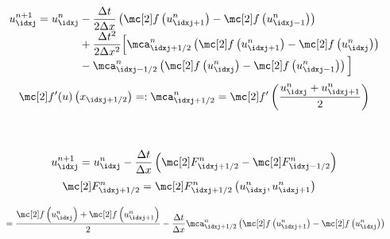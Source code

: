 \begin{defnbox}\nospacing
    \begin{defn}\label{defn:lax-wendroff_scheme}
        \begin{align}
          u_{\idxj}^{n+1}=u_{\idxj}^{n}&-\frac{\Delta t}{2\Delta x}
          \left(\flux \left(u_{\idxj+1}^{n}\right)-\flux \left(u_{\idxj-1}^{n}\right)\right)\\[-1\jot]
          &+\frac{\Delta t^{2}}{2\Delta x^{2}}
            \Big[\mca^{n}_{\idxj+1/2}\left(\flux \left(u_{\idxj+1}^{n}\right)-\flux \left(u_{\idxj}^{n}\right)\right)\nonumber\\[-1\jot]
            &-\mca_{\idxj-1/2}^{n}\left(\flux \left(u_{\idxj}^{n}\right)-\flux \left(u_{\idxj-1}^{n}\right)\right)\Big]\nonumber
        \end{align}
        \begin{align*}
          \flux'(u)\left(x_{\idxj+1/2}\right)=:\mca_{\idxj+1/2}^{n}=\flux' \left(\frac{u_{\idxj}^{n}+u^{n}_{\idxj+1}}{2}\right)
        \end{align*}
    \end{defn}
\end{defnbox}
\begin{corbox}\nospacing
    \begin{cor}\label{cor:as_a_finite_volume_scheme}\leavevmode\\
        \begin{minipage}{0.45\textwidth}
            \begin{align*}
            u_{\idxj}^{n+1}=u_{\idxj}^{n}-\frac{\Delta t}{\Delta x} \left(\Flux_{\idxj+1/2}^{n}-\Flux_{\idxj-1/2}^{n}\right)
            \end{align*}
            \begin{align*}
                &\Flux_{\idxj+1/2}^{n}=\Flux_{\idxj+1/2}^{n}\left(u_{\idxj}^{n},u_{\idxj+1}^{n}\right)
            \end{align*}
        \end{minipage}
        \begin{minipage}[c]{0.3\textwidth}
            \begin{figure}[H]
                \centering{
                  \def\svgwidth{70pt}
                  \resizebox{\linewidth}{!}{}
                }
            \end{figure}
        \end{minipage}
        \begin{align}
          &\quad=\frac{\flux \left(u_{\idxj}^{n}\right)+\flux \left(u_{\idxj+1}^{n}\right)}{2}
            -\frac{\Delta t}{\Delta x}\mca_{\idxj+1/2}^{n}
            \left(\flux\left(u_{\idxj+1}^{n}\right)-\flux \left(u_{\idxj}^{n}\right)\right)\nonumber
        \end{align}
    \end{cor}
\end{corbox}
